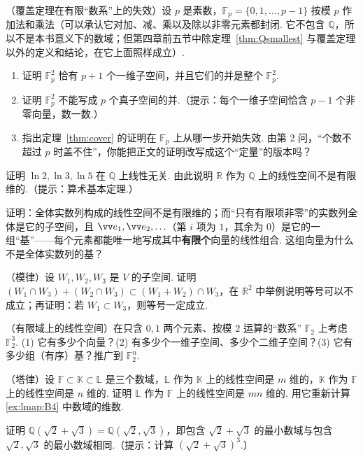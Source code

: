 {		\Cgroup
		\begin{exC}
			\item\label{ex:lmap:C1} （覆盖定理在有限“数系”上的失效）设 $p$ 是素数，$\mathbb{F}_p=\{0,1,\ldots,p-1\}$ 按模 $p$ 作加法和乘法（可以承认它对加、减、乘以及除以非零元素都封闭. 它不包含 $\mathbb{Q}$，所以不是本书意义下的数域；但第四章前五节中除定理~\ref{thm:Qsmallest} 与覆盖定理以外的定义和结论，在它上面照样成立）.
			\begin{enumerate}
				\item 证明 $\mathbb{F}_p^2$ 恰有 $p+1$ 个一维子空间，并且它们的并是整个 $\mathbb{F}_p^2$.
				\item 证明 $\mathbb{F}_p^2$ 不能写成 $p$ 个真子空间的并.（提示：每个一维子空间恰含 $p-1$ 个非零向量，数一数.）
				\item 指出定理~\ref{thm:cover} 的证明在 $\mathbb{F}_p$ 上从哪一步开始失效. 由第 2 问，“个数不超过 $p$ 时盖不住”，你能把正文的证明改写成这个“定量”的版本吗？
			\end{enumerate}
			\item\label{ex:lmap:C2} 证明 $\ln2,\ln3,\ln5$ 在 $\mathbb{Q}$ 上线性无关. 由此说明 $\mathbb{R}$ 作为 $\mathbb{Q}$ 上的线性空间不是有限维的.（提示：算术基本定理.）
			\item\label{ex:lmap:C3} 证明：全体实数列构成的线性空间不是有限维的；而“只有有限项非零”的实数列全体是它的子空间，且 $\vv e_1,\vv e_2,\ldots$（第 $i$ 项为 $1$，其余为 $0$）是它的一组“基”——每个元素都能唯一地写成其中\textbf{有限个}向量的线性组合. 这组向量为什么不是全体实数列的基？
			\item\label{ex:lmap:C4} （模律）设 $W_1,W_2,W_3$ 是 $V$ 的子空间. 证明 $(W_1\cap W_3)+(W_2\cap W_3)\subset(W_1+W_2)\cap W_3$，在 $\mathbb{R}^2$ 中举例说明等号可以不成立；再证明：若 $W_1\subset W_3$，则等号一定成立.
			\item\label{ex:lmap:C5} （有限域上的线性空间）在只含 $0,1$ 两个元素、按模 $2$ 运算的“数系” $\mathbb{F}_2$ 上考虑 $\mathbb{F}_2^3$. (1) 它有多少个向量？(2) 有多少个一维子空间、多少个二维子空间？(3) 它有多少组（有序）基？推广到 $\mathbb{F}_2^n$.
			\item\label{ex:lmap:C6} （塔律）设 $\mathbb{F}\subset\mathbb{K}\subset\mathbb{L}$ 是三个数域，$\mathbb{L}$ 作为 $\mathbb{K}$ 上的线性空间是 $m$ 维的，$\mathbb{K}$ 作为 $\mathbb{F}$ 上的线性空间是 $n$ 维的. 证明 $\mathbb{L}$ 作为 $\mathbb{F}$ 上的线性空间是 $mn$ 维的. 用它重新计算 \ref{ex:lmap:B4} 中数域的维数.
			\item\label{ex:lmap:C7} 证明 $\mathbb{Q}(\sqrt2+\sqrt3)=\mathbb{Q}(\sqrt2,\sqrt3)$，即包含 $\sqrt2+\sqrt3$ 的最小数域与包含 $\sqrt2,\sqrt3$ 的最小数域相同.（提示：计算 $(\sqrt2+\sqrt3)^3$.）

\end{exC}}
